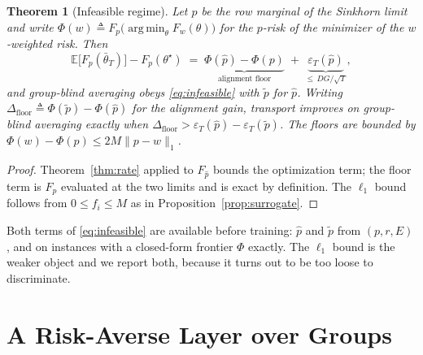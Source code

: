 \documentclass{article}
\newtheorem{theorem}{Theorem}
\theoremstyle{definition}
\newcommand{\E}{\mathbb{E}}
\DeclareMathOperator*{\argmin}{arg\,min}
\begin{document}
\begin{theorem}[Infeasible regime]
\label{thm:infeasible}
Let $\hat p$ be the row marginal of the Sinkhorn limit and write
$\Phi(w)\triangleq F_p\big(\argmin_\theta F_w(\theta)\big)$ for the $p$-risk of
the minimizer of the $w$-weighted risk. Then
\begin{equation}
\E\big[F_p(\bar\theta_T)\big]-F_p(\theta^\star)
\;=\;\underbrace{\Phi(\hat p)-\Phi(p)}_{\text{alignment floor}}
\;+\;\underbrace{\varepsilon_T(\hat p)}_{\le\,DG/\sqrt{T}} ,
\label{eq:infeasible}
\end{equation}
and group-blind averaging obeys \eqref{eq:infeasible} with $\tilde p$ for
$\hat p$. Writing $\Delta_{\mathrm{floor}}\triangleq\Phi(\tilde p)-\Phi(\hat p)$
for the alignment gain, transport improves on group-blind averaging exactly
when $\Delta_{\mathrm{floor}}>\varepsilon_T(\hat p)-\varepsilon_T(\tilde p)$.
The floors are bounded by $\Phi(w)-\Phi(p)\le 2M\|p-w\|_1$.
\end{theorem}
\begin{proof}
Theorem~\ref{thm:rate} applied to $F_{\hat p}$ bounds the optimization term;
the floor term is $F_p$ evaluated at the two limits and is exact by definition.
The $\ell_1$ bound follows from $0\le f_i\le M$ as in
Proposition~\ref{prop:surrogate}.
\end{proof}

Both terms of \eqref{eq:infeasible} are available before training: $\hat p$ and
$\tilde p$ from $(p,r,E)$, and on instances with a closed-form frontier
$\Phi$ exactly. The $\ell_1$ bound is the weaker object and we report both,
because it turns out to be too loose to discriminate.

\section{A Risk-Averse Layer over Groups}
\label{sec:cvar}
\end{document}
